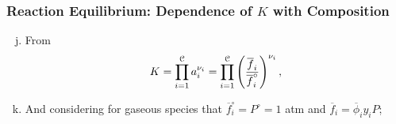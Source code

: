 \documentclass[10pt,compress,unknownkeysallowed]{beamer}
\begin{document}
\begin{frame}
  \frametitle{Reaction Equilibrium:  Dependence of $K$ with Composition } 
      \begin{enumerate}[a)] \setcounter{enumi}{9} 
         \item<1-> From 
           \begin{displaymath}
                K = \prod\limits_{i=1}^{\mathcal{C}} a_{i}^{\nu_{i}} = \prod\limits_{i=1}^{\mathcal{C}} \left(\displaystyle\frac{\overline{f}_{i}}{\overline{f}_{i}^{\circ}}\right)^{\nu_{i}},
           \end{displaymath} 
         \item<2-> And considering for gaseous species that $\overline{f}_{i}^{\circ}=P^{\circ}=1$ atm and $\overline{f}_{i} = \overline{\phi}_{i}y_{i}P$;
      \end{enumerate}

\end{frame}
\end{document}
